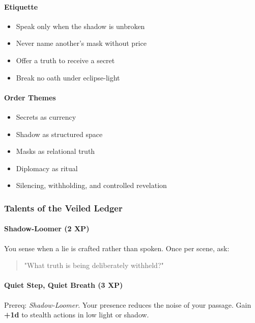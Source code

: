\documentclass[11pt]{book}
\begin{document}
\paragraph{Etiquette}
\begin{itemize}[leftmargin=*]
    \item Speak only when the shadow is unbroken  
    \item Never name another's mask without price  
    \item Offer a truth to receive a secret  
    \item Break no oath under eclipse-light  
\end{itemize}

\paragraph{Order Themes}
\begin{itemize}[leftmargin=*]
    \item Secrets as currency  
    \item Shadow as structured space  
    \item Masks as relational truth  
    \item Diplomacy as ritual  
    \item Silencing, withholding, and controlled revelation  
\end{itemize}

\subsubsection{Talents of the Veiled Ledger}

\paragraph{Shadow-Loomer (2 XP)}
You sense when a lie is crafted rather than spoken.  
Once per scene, ask:
\begin{quote}
    "What truth is being deliberately withheld?"
\end{quote}

\paragraph{Quiet Step, Quiet Breath (3 XP)}
Prereq: \emph{Shadow-Loomer}.  
Your presence reduces the noise of your passage.  
Gain \textbf{+1d} to stealth actions in low light or shadow.
\end{document}
